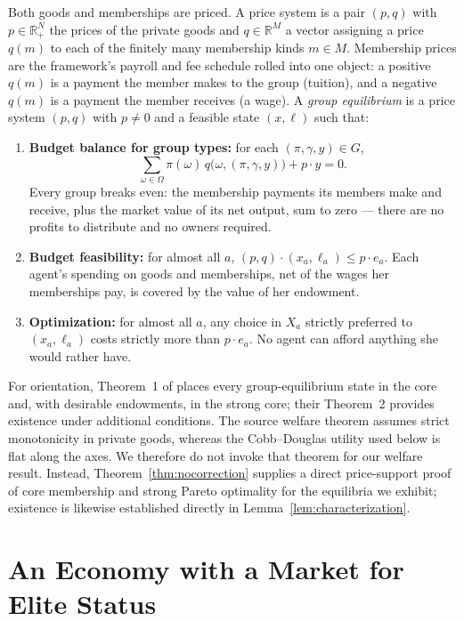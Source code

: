 \documentclass[12pt,letterpaper]{article}
\theoremstyle{definition}
\newcommand{\R}{\mathbb{R}}
\begin{document}
Both goods and memberships are priced.
A price system is a pair $(p,q)$ with $p\in\R^N_+$ the prices of the private goods and $q\in\R^{M}$ a vector assigning a price $q(m)$ to each of the finitely many membership kinds $m\in M$.
Membership prices are the framework's payroll and fee schedule rolled into one object: a positive $q(m)$ is a payment the member makes to the group (tuition), and a negative $q(m)$ is a payment the member receives (a wage).
A \emph{group equilibrium} is a price system $(p,q)$ with $p\neq 0$ and a feasible state $(x,\ell)$ such that:
\begin{enumerate}
\item \textbf{Budget balance for group types:} for each $(\pi,\gamma,y)\in G$,
\[
\sum_{\omega\in\Omega}\pi(\omega)\,
q\big(\omega,(\pi,\gamma,y)\big)+p\cdot y=0.
\]
Every group breaks even: the membership payments its members make and receive, plus the market value of its net output, sum to zero --- there are no profits to distribute and no owners required.
\item \textbf{Budget feasibility:} for almost all $a$, $(p,q)\cdot(x_a,\ell_a)\leq p\cdot e_a$.
Each agent's spending on goods and memberships, net of the wages her memberships pay, is covered by the value of her endowment.
\item \textbf{Optimization:} for almost all $a$, any choice in $X_a$ strictly preferred to $(x_a,\ell_a)$ costs strictly more than $p\cdot e_a$.
No agent can afford anything she would rather have.
\end{enumerate}

For orientation, Theorem~1 of \citet{ellickson2006organization} places every group-equilibrium state in the core and, with desirable endowments, in the strong core; their Theorem~2 provides existence under additional conditions.
The source welfare theorem assumes strict monotonicity in private goods, whereas the Cobb--Douglas utility used below is flat along the axes.
We therefore do not invoke that theorem for our welfare result.
Instead, Theorem~\ref{thm:nocorrection} supplies a direct price-support proof of core membership and strong Pareto optimality for the equilibria we exhibit; existence is likewise established directly in Lemma~\ref{lem:characterization}.

\section{An Economy with a Market for Elite Status}\label{sec:model}
\end{document}
